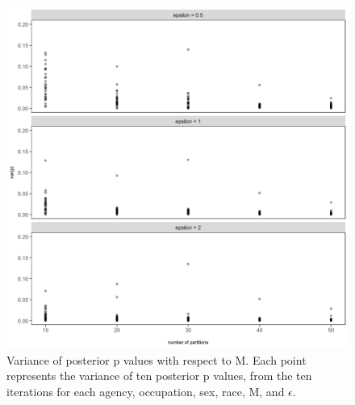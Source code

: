 \documentclass[10pt, letterpaper]{article}
\begin{document}
\begin{spacing}{1.0}
\begin{figure}[h!]
    \centering
    \includegraphics[width=6in]{RacePayDifferential-p-Variance-nPartitions.png}
    \caption{Variance of posterior p values with respect to M.  Each point represents the variance of ten posterior p values, from the ten iterations for each agency, occupation, sex, race, M, and $\epsilon$.}
    \label{figure:RacePayDifferential-p-Variance-nPartitions}
\end{figure}

\clearpage



\end{spacing}
\end{document}
